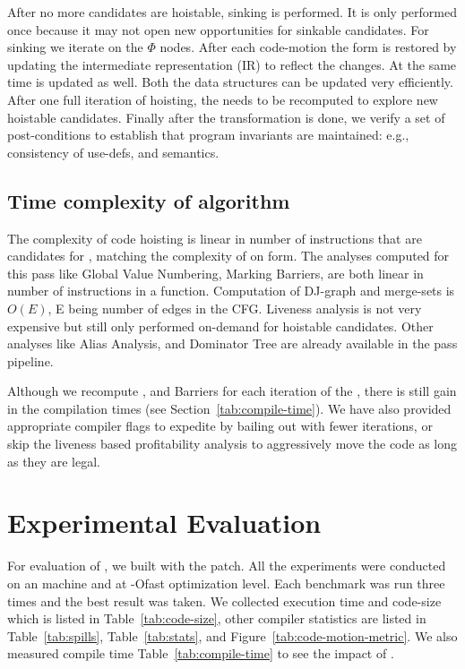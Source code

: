 \documentclass[sigplan,10pt,review,anonymous]{acmart}\settopmatter{printfolios=true,printccs=false,printacmref=false}
\begin{document}
After no more candidates are hoistable, sinking is performed. It is only
performed once because it may not open new opportunities for sinkable
candidates. For sinking we iterate on the $\Phi$ nodes. After each code-motion
the \SSA{} form is restored by updating the intermediate representation (IR) to
reflect the changes. At the same time \MemorySSA{} is updated as well. Both the
data structures can be updated very efficiently. After one full iteration of
hoisting, the \GVN{} needs to be recomputed to explore new hoistable candidates.
Finally after the transformation is done, we verify a set of post-conditions to
establish that program invariants are maintained: e.g., consistency of use-defs,
and \SSA{} semantics.


\subsection{Time complexity of algorithm}
The complexity of code hoisting is linear in number of instructions that are
candidates for \gcm{}, matching the complexity of \PRE{} on \SSA{} form.  The
analyses computed for this pass like Global Value Numbering, Marking Barriers,
are both linear in number of instructions in a function. Computation of DJ-graph
and merge-sets is $O(E)$, E being number of edges in the CFG. Liveness analysis
is not very expensive \cite{das2012} but still only performed on-demand for
hoistable candidates. Other analyses like Alias Analysis, \MemorySSA{} and
Dominator Tree are already available in the \LLVM{} pass pipeline.

Although we recompute \GVN{}, and Barriers for each iteration of the \gcm{},
there is still gain in the compilation times (see
Section~\ref{tab:compile-time}). We have also provided appropriate compiler
flags to expedite \gcm{} by bailing out with fewer iterations, or skip the
liveness based profitability analysis to aggressively move the code as long as
they are legal.

\section{Experimental Evaluation}
\label{sec:experimental-results}
For evaluation of \gcm{}, we built \SPEC{} with the patch. All the experiments
were conducted on an \xlinux{} machine and at -Ofast optimization level. Each
benchmark was run three times and the best result was taken. We collected
execution time and code-size which is listed in Table~\ref{tab:code-size}, other
compiler statistics are listed in Table~\ref{tab:spills}, Table~\ref{tab:stats}, and
Figure~\ref{tab:code-motion-metric}.  We also measured compile time
Table~\ref{tab:compile-time} to see the impact of \gcm{}.
\end{document}
